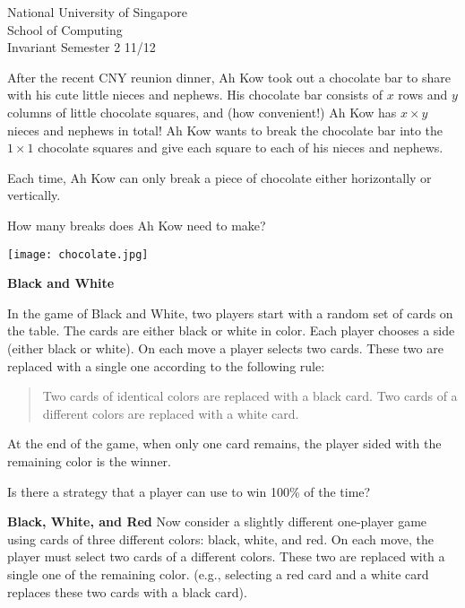 \documentclass[answers,a4paper,11pt]{exam}
\begin{document}
\extraheadheight{.5in}
%
{\large\sf National University of Singapore\\ School of Computing \\
\LARGE\sf Invariant}%
{\large\sf Semester 2 11/12}
\firstpageheadrule
\pagestyle{headandfoot}

\begin{questions}
\question

After the recent CNY reunion dinner, Ah Kow took out a chocolate bar to share with his cute little nieces and nephews.  His chocolate bar consists of $x$ rows and $y$ columns of little chocolate squares, and (how convenient!) Ah Kow has $x \times y$ nieces and nephews in total!  Ah Kow wants to break the chocolate bar into the $1 \times 1$ chocolate squares and give each square to each of his nieces and nephews.

Each time, Ah Kow can only break a piece of chocolate either horizontally or vertically.

How many breaks does Ah Kow need to make?

\begin{center}
\texttt{[image: chocolate.jpg]}
\end{center}

\fillwithdottedlines{4in}
\newpage
\question
\textbf{Black and White}

In the game of Black and White, two players start with a random set of cards on the table.  The cards are either black or white in color.  Each player chooses a side (either black or white).  On each move a player selects two cards. These two are replaced with a single one according to the following rule:

\begin{quote}
Two cards of identical colors are replaced with a black card.  Two cards of a different colors are replaced with a white card.
\end{quote}

At the end of the game, when only one card remains, the player sided with the remaining color is the winner.

Is there a strategy that a player can use to win 100\% of the time?

\fillwithdottedlines{5in}

\newpage
\question
\textbf{Black, White, and Red}
Now consider a slightly different one-player game using cards of three different colors: black, white, and red.  On each move, the player must select two cards of a different colors.  These two are replaced with a single one of the remaining color.  (e.g., selecting a red card and a white card replaces these two cards with a black card).  


\end{questions}
\end{document}
